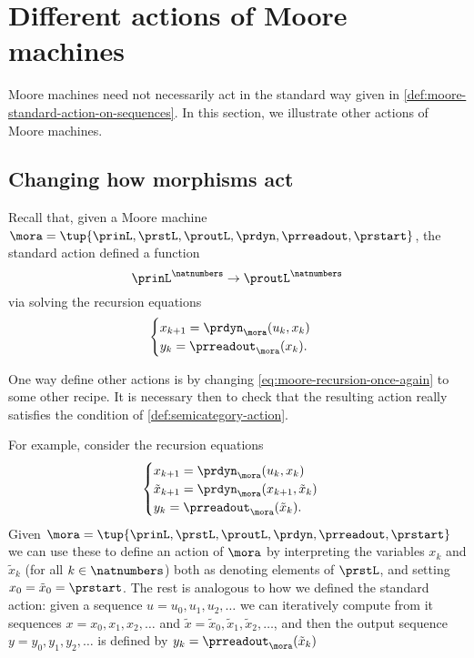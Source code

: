 
\section{Different actions of Moore machines}
\label{sec:different-actions-of-moore-machines}


Moore machines need not necessarily act in the standard way given in \cref{def:moore-standard-action-on-sequences}. In this section, we illustrate other actions of Moore machines. 

\subsection{Changing how morphisms act}

Recall that, given a Moore machine $\mora = \tup{\prinL,\prstL,\proutL,\prdyn,\prreadout,\prstart}$, the standard action defined a function 
\begin{equation}
{\prinL}^\natnumbers \to {\proutL}^\natnumbers
\end{equation}
via solving the recursion equations 
\begin{equation}
\label{eq:moore-recursion-once-again}
    \begin{cases}
        x_{k+1} = \prdyn_\mora(u_k, x_k) \\
        y_{k}   = \prreadout_\mora(x_{k}).
    \end{cases}
\end{equation}

One way define other actions is by changing \cref{eq:moore-recursion-once-again} to some other recipe. It is necessary then to check that the resulting action really satisfies the condition of \cref{def:semicategory-action}. 

For example, consider the recursion equations
\begin{equation}
\label{eq:moore-new-recursion-equations}
    \begin{cases}
        x_{k+1} = \prdyn_\mora(u_k, x_k) \\
        \tilde x_{k+1} = \prdyn_\mora(x_{k+1}, \tilde x_k) \\
        y_{k}   = \prreadout_\mora(\tilde x_{k}).
    \end{cases}
\end{equation}
Given  $\mora = \tup{\prinL,\prstL,\proutL,\prdyn,\prreadout,\prstart}$ we can use these to define an action of $\mora$ by interpreting the variables $x_k$ and $\tilde x_k$ (for all $k \in \natnumbers$) both as denoting elements of $\prstL$, and setting $x_0 = \tilde x_0 = \prstart$. The rest is analogous to how we defined the standard action: given a sequence $u = u_0, u_1, u_2, \dots$ we can iteratively compute from it sequences $x = x_0, x_1, x_2, \dots $ and $\tilde x = \tilde x_0, \tilde x_1, \tilde x_2, \dots$, and then the output sequence $y = y_0, y_1, y_2, \dots $ is defined by $y_{k}   = \prreadout_\mora(\tilde x_{k})$


